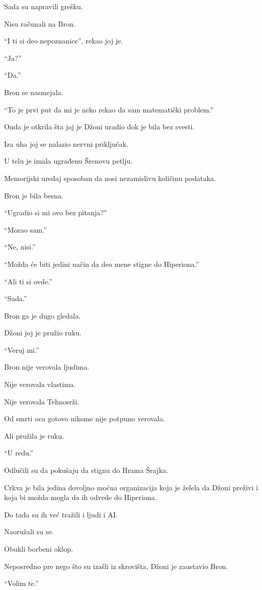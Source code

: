 Sada su napravili grešku.

Nisu računali na Bron.

``I ti si deo nepoznanice'', rekao joj je.

``Ja?''

``Da.''

Bron se nasmejala.

``To je prvi put da mi je neko rekao da sam matematički problem.''

\bigskip

Onda je otkrila šta joj je Džoni uradio dok je bila bez svesti.

Iza uha joj se nalazio nervni priključak.

U telu je imala ugrađenu Šrenovu petlju.

Memorijski uređaj sposoban da nosi nezamislivu količinu podataka.

Bron je bila besna.

``Ugradio si mi ovo bez pitanja?''

``Morao sam.''

``Ne, nisi.''

``Možda će biti jedini način da deo mene stigne do Hiperiona.''

``Ali ti si ovde.''

``Sada.''

Bron ga je dugo gledala.

Džoni joj je pružio ruku.

``Veruj mi.''

Bron nije verovala ljudima.

Nije verovala vlastima.

Nije verovala Tehnosrži.

Od smrti oca gotovo nikome nije potpuno verovala.

Ali pružila je ruku.

``U redu.''

\bigskip

Odlučili su da pokušaju da stignu do Hrama Šrajka.

Crkva je bila jedina dovoljno moćna organizacija koja je želela da Džoni preživi i koja bi možda mogla da ih odvede do Hiperiona.

Do tada su ih već tražili i ljudi i AI.

Naoružali su se.

Obukli borbeni oklop.

Neposredno pre nego što su izašli iz skrovišta, Džoni je zaustavio Bron.

``Volim te.''

